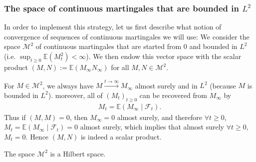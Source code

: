 \documentclass[../mainfile.tex]{subfiles}
\begin{document}
\subsubsection{The space of continuous martingales that are bounded in $L^2$}
In order to implement this strategy, let us first describe what notion of convergence of sequences of continuous martingales we will use: We consider the space $\mathcal{M}^2$ of continuous martingales that are started from $0$ and bounded in $L^2$ (i.e. $\sup_{t \geq 0} \mathbb{E}( M_t^2) < \infty$). We then endow this vector space with the scalar product $(M,N):= \mathbb{E}(M_\infty N_\infty)$ for all $M,N \in \mathcal{M}^2$. 
\begin{rem} For $M \in \mathcal{M}^2$, we always have $M \xrightarrow{t \to \infty} M_\infty$ almost surely and in $L^2$ (because $M$ is bounded in $L^2$). moreover, all of $(M_t)_{t \geq 0}$ can be recovered from $M_\infty$ by 
\begin{align*}
M_t = \mathbb{E}( M_\infty \mid \mathcal{F}_t). 
\end{align*}
Thus if $(M,M)=0$, then $M_\infty=0$ almost surely,  and therefore $ \forall t \geq 0$, $M_t=\mathbb{E}(M_\infty \mid \mathcal{F}_t)=0$ almost surely, which implies that almost surely $\forall t \geq 0$, $M_t=0$. Hence $(M,N)$ is indeed a scalar product. 
\end{rem}
\newpage
\begin{lem} The space $\mathcal{M}^2$ is a Hilbert space.
\end{lem}
\end{document}
